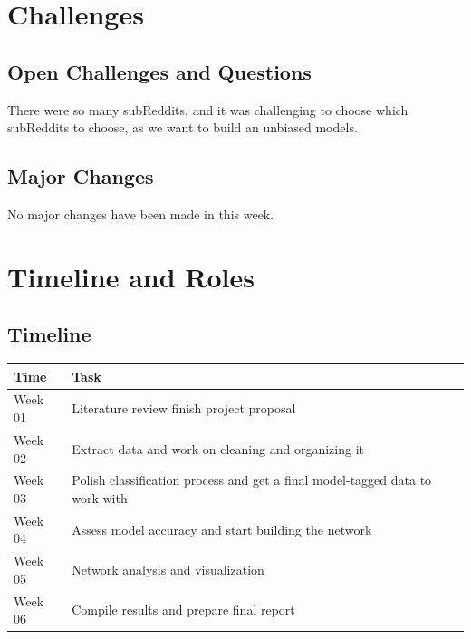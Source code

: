 \documentclass{article}
\begin{document}
\begin{multicols}{2}
\section{Challenges}
    \subsection{Open Challenges and Questions}
    \hspace{5mm}There were so many subReddits, and it was challenging to choose which subReddits to choose, as we want to build an unbiased models.
    
    \subsection{Major Changes}
        \hspace{5mm}No major changes have been made in this week.
\section{Timeline and Roles}
    \subsection{Timeline}
        \begin{tabular}{m{3.8em} | m{19em}} 
        \hline
        Time & Task \\ [0.5ex] 
        \hline\hline
        \small Week 01 & Literature review finish project proposal \\ 
        \hline
        \small Week 02 & Extract data and work on cleaning and organizing it \\
        \hline
        \small Week 03 & Polish classification process and get a final model-tagged data to work with \\
        \hline
        \small Week 04 & Assess model accuracy and start building the network \\
        \hline
        \small Week 05 & Network analysis and visualization \\
        \hline
        \small Week 06 & Compile results and prepare final report \\
        \end{tabular}

\end{multicols}
\end{document}
